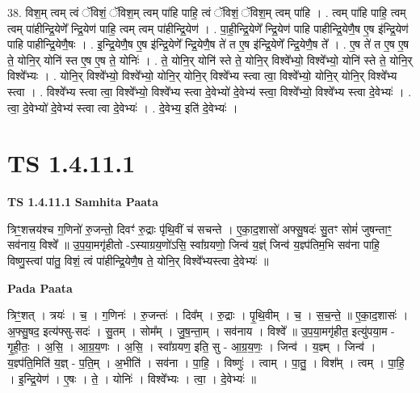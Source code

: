 \documentclass[17pt]{extarticle}
\begin{document}
38. विश॒म् त्वम् त्वं ॅविशं॒ ॅविश॒म् त्वम् पा॑हि पाहि॒ त्वं ॅविशं॒ ॅविश॒म् त्वम् पा॑हि । . त्वम् पा॑हि पाहि॒ त्वम् त्वम् पा॑हीन्द्रि॒येणे᳚ न्द्रि॒येण॑ पाहि॒ त्वम् त्वम् पा॑हीन्द्रि॒येण॑ । . पा॒ही॒न्द्रि॒येणे᳚ न्द्रि॒येण॑ पाहि पाहीन्द्रि॒येणै॒ष ए॒ष इ॑न्द्रि॒येण॑ पाहि पाहीन्द्रि॒येणै॒षः । . इ॒न्द्रि॒येणै॒ष ए॒ष इ॑न्द्रि॒येणे᳚ न्द्रि॒येणै॒ष ते॑ त ए॒ष इ॑न्द्रि॒येणे᳚ न्द्रि॒येणै॒ष ते᳚ । . ए॒ष ते॑ त ए॒ष ए॒ष ते॒ योनि॒र् योनि॑ स्त ए॒ष ए॒ष ते॒ योनिः॑ । . ते॒ योनि॒र् योनि॑ स्ते ते॒ योनि॒र् विश्वे᳚भ्यो॒ विश्वे᳚भ्यो॒ योनि॑ स्ते ते॒ योनि॒र् विश्वे᳚भ्यः । . योनि॒र् विश्वे᳚भ्यो॒ विश्वे᳚भ्यो॒ योनि॒र् योनि॒र् विश्वे᳚भ्य स्त्वा त्वा॒ विश्वे᳚भ्यो॒ योनि॒र् योनि॒र् विश्वे᳚भ्य स्त्वा । . विश्वे᳚भ्य स्त्वा त्वा॒ विश्वे᳚भ्यो॒ विश्वे᳚भ्य स्त्वा दे॒वेभ्यो॑ दे॒वेभ्य॑ स्त्वा॒ विश्वे᳚भ्यो॒ विश्वे᳚भ्य स्त्वा दे॒वेभ्यः॑ । . त्वा॒ दे॒वेभ्यो॑ दे॒वेभ्य॑ स्त्वा त्वा दे॒वेभ्यः॑ । . दे॒वेभ्य॒ इति॑ दे॒वेभ्यः॑ । \newline
\pagebreak
{}

\section{ TS 1.4.11.1 }

\textbf{TS 1.4.11.1 } \newline
\textbf{Samhita Paata} \newline

त्रिꣳ॒॒शत्त्रय॑श्च ग॒णिनो॑ रु॒जन्तो॒ दिवꣳ॑ रु॒द्राः पृ॑थि॒वीं च॑ सचन्ते । ए॒का॒द॒शासो॑ अफ्सु॒षदः॑ सु॒तꣳ सोमं॑ जुषन्ताꣳ॒॒ सव॑नाय॒ विश्वे᳚ ॥ उ॒प॒या॒मगृ॑हीतो -ऽस्याग्रय॒णो॑ऽसि॒ स्वा᳚ग्रयणो॒ जिन्व॑ य॒ज्ञ्ं जिन्व॑ य॒ज्ञ्प॑तिम॒भि सव॑ना पाहि॒ विष्णु॒स्त्वां पा॑तु॒ विशं॒ त्वं पा॑हीन्द्रि॒येणै॒ष ते॒ योनि॒र् विश्वे᳚भ्यस्त्वा दे॒वेभ्यः॑ ॥ \newline

\textbf{Pada Paata} \newline

त्रिꣳ॒॒शत् । त्रयः॑ । च॒ । ग॒णिनः॑ । रु॒जन्तः॑ । दिव᳚म् । रु॒द्राः । पृ॒थि॒वीम् । च॒ । स॒च॒न्ते॒ ॥ ए॒का॒द॒शासः॑ । अ॒फ्सु॒षद॒ इत्य॑फ्सु-सदः॑ । सु॒तम् । सोम᳚म् । जु॒ष॒न्ता॒म् । सव॑नाय । विश्वे᳚ ॥ उ॒प॒या॒मगृ॑हीत॒ इत्यु॑पया॒म - गृ॒ही॒तः॒ । अ॒सि॒ । आ॒ग्र॒य॒णः । अ॒सि॒ । स्वा᳚ग्रयण॒ इति॒ सु - आ॒ग्र॒य॒णः॒ । जिन्व॑ । य॒ज्ञ्म् । जिन्व॑ । य॒ज्ञ्प॑ति॒मिति॑ य॒ज्ञ् - प॒ति॒म् । अ॒भीति॑ । सव॑ना । पा॒हि॒ । विष्णुः॑ । त्वाम् । पा॒तु॒ । विश᳚म् । त्वम् । पा॒हि॒ । इ॒न्द्रि॒येण॑ । ए॒षः । ते॒ । योनिः॑ । विश्वे᳚भ्यः । त्वा॒ । दे॒वेभ्यः॑ ॥  \newline
\end{document}
